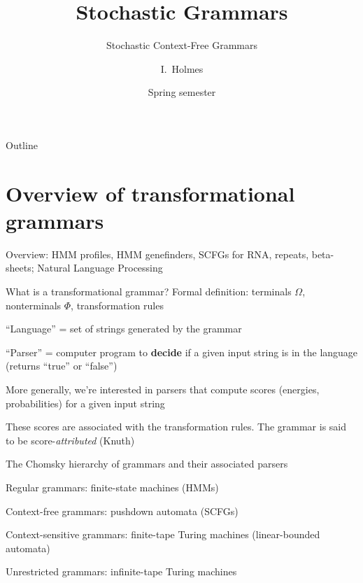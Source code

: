\documentclass{beamer}
\title[SCFGs] %
{Stochastic Grammars}
\subtitle
{Stochastic Context-Free Grammars} %
\author%
{I.~Holmes} %
\institute[University of California, Berkeley] %
{
  Department of Bioengineering\\
  University of California, Berkeley}
\date%
{Spring semester}
\begin{document}
\begin{frame}
  \titlepage
\end{frame}

\begin{frame}{Outline}
  \tableofcontents
\end{frame}



\section{Overview of transformational grammars}

\begin{frame}{}

\itemb
\item Overview: HMM profiles, HMM genefinders, SCFGs for RNA, repeats, beta-sheets; Natural Language Processing
\item What is a transformational grammar? Formal definition: terminals $\Omega$, nonterminals $\Phi$, transformation rules
 \itemb
 \item ``Language'' = set of strings generated by the grammar
 \item ``Parser'' = computer program to {\bf decide} if a given input string is in the language (returns ``true'' or ``false'')
 \item More generally, we're interested in parsers that compute scores (energies, probabilities) for a given input string
 \item These scores are associated with the transformation rules. The grammar is said to be score-{\em attributed} (Knuth)
 \iteme
\iteme
\end{frame}
\begin{frame}{}
\itemb
\item The Chomsky hierarchy of grammars and their associated parsers
 \itemb
 \item Regular grammars: finite-state machines (HMMs)
 \item Context-free grammars: pushdown automata (SCFGs)
 \item Context-sensitive grammars: finite-tape Turing machines (linear-bounded automata)
 \item Unrestricted grammars: infinite-tape Turing machines
 \iteme
\iteme
\end{frame}
\end{document}
